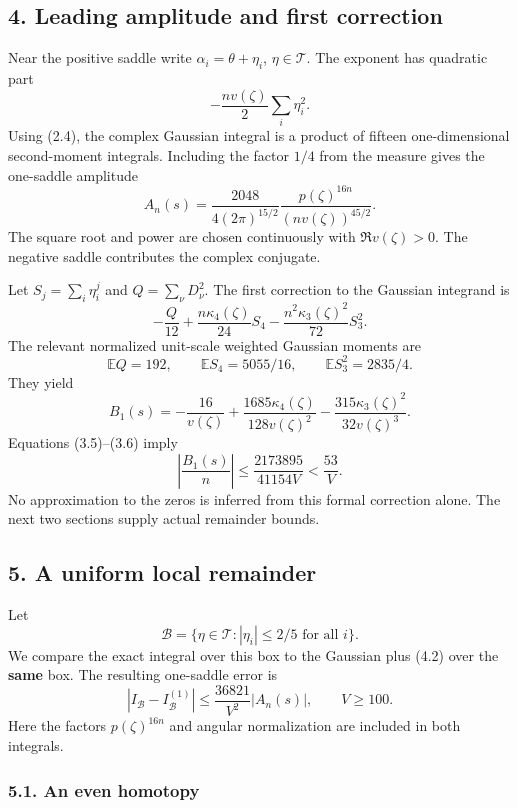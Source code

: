 \documentclass[
  11pt,
]{article}
\begin{document}
\subsection{4. Leading amplitude and first
correction}\label{leading-amplitude-and-first-correction}

Near the positive saddle write \(\alpha_i=\theta+\eta_i\),
\(\eta\in\mathcal T\). The exponent has quadratic part \[
 -\frac{n v(\zeta)}2\sum_i\eta_i^2.
\] Using (2.4), the complex Gaussian integral is a product of fifteen
one-dimensional second-moment integrals. Including the factor \(1/4\)
from the measure gives the one-saddle amplitude \[
 A_n(s)=\frac{2048}{4(2\pi)^{15/2}}
        \frac{p(\zeta)^{16n}}{(n v(\zeta))^{45/2}}.              \tag{4.1}
\] The square root and power are chosen continuously with
\(\Re v(\zeta)>0\). The negative saddle contributes the complex
conjugate.

Let \(S_j=\sum_i\eta_i^j\) and \(Q=\sum_\nu D_\nu^2\). The first
correction to the Gaussian integrand is \[
 -\frac Q{12}+\frac{n\kappa_4(\zeta)}{24}S_4
       -\frac{n^2\kappa_3(\zeta)^2}{72}S_3^2.                 \tag{4.2}
\] The relevant normalized unit-scale weighted Gaussian moments are \[
 \mathbb EQ=192,\qquad \mathbb ES_4=5055/16,
 \qquad \mathbb ES_3^2=2835/4.
\] They yield \[
 B_1(s)=-\frac{16}{v(\zeta)}
  +\frac{1685\kappa_4(\zeta)}{128v(\zeta)^2}
  -\frac{315\kappa_3(\zeta)^2}{32v(\zeta)^3}.                 \tag{4.3}
\] Equations (3.5)--(3.6) imply \[
 \left|\frac{B_1(s)}n\right|
 \le\frac{2173895}{41154V}<\frac{53}{V}.                     \tag{4.4}
\] No approximation to the zeros is inferred from this formal correction
alone. The next two sections supply actual remainder bounds.

\subsection{5. A uniform local
remainder}\label{a-uniform-local-remainder}

Let \[
 \mathcal B=\{\eta\in\mathcal T:|\eta_i|\le2/5\text{ for all }i\}.
\] We compare the exact integral over this box to the Gaussian plus
(4.2) over the \textbf{same} box. The resulting one-saddle error is \[
 \left|I_{\mathcal B}-I_{\mathcal B}^{(1)}\right|
 \le \frac{36821}{V^2}|A_n(s)|,\qquad V\ge100.                 \tag{5.1}
\] Here the factors \(p(\zeta)^{16n}\) and angular normalization are
included in both integrals.

\subsubsection{5.1. An even homotopy}\label{an-even-homotopy}
\end{document}

